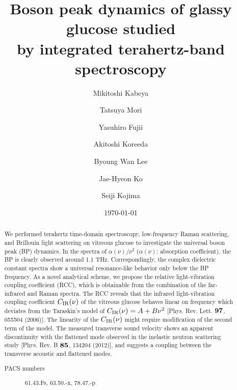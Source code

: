 \documentclass[%
 reprint,
superscriptaddress,
 amsmath,amssymb,
 aps,
prb,
]{revtex4-1}
\begin{document}

\title{Boson peak dynamics of glassy glucose studied \\by integrated terahertz-band spectroscopy}


\author{Mikitoshi Kabeya}
\author{Tatsuya Mori}%
%

\author{Yasuhiro Fujii}
\author{Akitoshi Koreeda}%
%

\author{Byoung Wan Lee}
\author{Jae-Hyeon Ko}
%

\author{Seiji Kojima}
%

\date{\today}%

\begin{abstract}
We performed terahertz time-domain spectroscopy, low-frequency Raman scattering, and Brillouin light scattering on vitreous glucose to investigate the universal boson peak (BP) dynamics.
In the spectra of $\alpha(\nu)/\nu^{2}$ ($\alpha(\nu)$: absorption coefficient), the BP is clearly observed around 1.1 THz.
Correspondingly, the complex dielectric constant spectra show a universal resonance-like behavior only below the BP frequency.
As a novel analytical scheme, we propose the relative light-vibration coupling coefficient (RCC), which is obtainable from the combination of the far-infrared and Raman spectra.
The RCC reveals that the infrared light-vibration coupling coefficient $C_{\rm IR}(\nu)$ of the vitreous glucose behaves linear on frequency which deviates from the Taraskin's model of $C_{\rm IR}(\nu)=A+B\nu^{2}$ [Phys. Rev. Lett. $\bf 97$, 055504 (2006)]. The linearity of the $C_{\rm IR}(\nu)$ might require modification of the second term of the model. The measured transverse sound velocity shows an apparent discontinuity with the flattened mode observed in the inelastic neutron scattering study [Phys. Rev. B $\bf 85$, 134204 (2012)], and suggests a coupling between the transverse acoustic and flattened modes.
\begin{description}
\item[PACS numbers]
61.43.Fs, 63.50.-x, 78.47.-p
\end{description}
\end{abstract}
\end{document}
